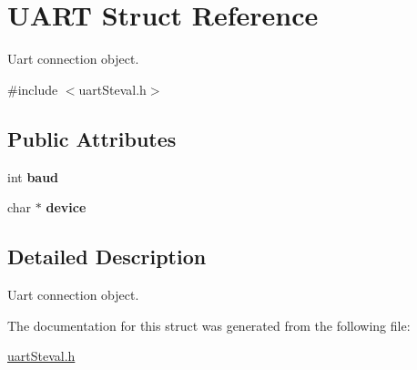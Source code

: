 \hypertarget{structUART}{}\section{U\+A\+RT Struct Reference}
\label{structUART}


Uart connection object.  




{\ttfamily \#include $<$uart\+Steval.\+h$>$}

\subsection*{Public Attributes}
\begin{DoxyCompactItemize}
\item 
\mbox{\label{structUART_a3c490cf9ac5b2870d72a37d6bdf8524e}} 
int {\bfseries baud}
\item 
\mbox{\label{structUART_a122d3c21881e89f95d877f0271b82b60}} 
char $\ast$ {\bfseries device}
\end{DoxyCompactItemize}


\subsection{Detailed Description}
Uart connection object. 

The documentation for this struct was generated from the following file\+:\begin{DoxyCompactItemize}
\item 
\hyperlink{uartSteval_8h}{uart\+Steval.\+h}\end{DoxyCompactItemize}
